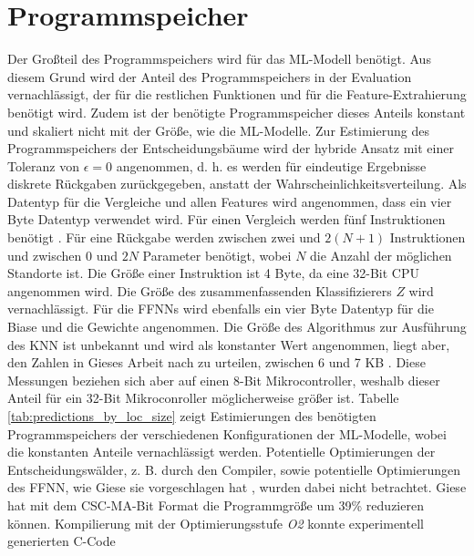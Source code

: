 \section{Programmspeicher}
Der Großteil des Programmspeichers wird für das ML-Modell benötigt.
Aus diesem Grund wird der Anteil des Programmspeichers in der Evaluation vernachlässigt,
der für die restlichen Funktionen und für die Feature-Extrahierung benötigt wird.
Zudem ist der benötigte Programmspeicher dieses Anteils konstant und skaliert nicht mit der Größe, wie die ML-Modelle.
\newline
\newline
Zur Estimierung des Programmspeichers der Entscheidungsbäume wird der hybride Ansatz mit einer Toleranz von $\epsilon=0$ angenommen,
d. h. es werden für eindeutige Ergebnisse diskrete Rückgaben zurückgegeben, anstatt der Wahrscheinlichkeitsverteilung.
Als Datentyp für die Vergleiche und allen Features wird angenommen, dass ein vier Byte Datentyp verwendet wird.
Für einen Vergleich werden fünf Instruktionen benötigt \cite{dymelThesis}.
Für eine Rückgabe werden zwischen zwei und $2(N+1)$ Instruktionen und zwischen 0 und $2N$ Parameter benötigt,
wobei $N$ die Anzahl der möglichen Standorte ist.
Die Größe einer Instruktion ist 4 Byte, da eine 32-Bit CPU angenommen wird.
Die Größe des zusammenfassenden Klassifizierers $Z$ wird vernachlässigt.
\newline
\newline
Für die FFNNs wird ebenfalls ein vier Byte Datentyp für die Biase und die Gewichte angenommen.
Die Größe des Algorithmus zur Ausführung des KNN ist unbekannt und wird als konstanter Wert angenommen,
liegt aber, den Zahlen in Gieses Arbeit nach zu urteilen, zwischen 6 und 7 KB \cite{gieseThesis}.
Diese Messungen beziehen sich aber auf einen 8-Bit Mikrocontroller, weshalb dieser Anteil für ein 32-Bit Mikroconroller möglicherweise größer ist.
\newline
\newline
Tabelle \ref{tab:predictions_by_loc_size} zeigt Estimierungen des benötigten Programmspeichers der verschiedenen Konfigurationen der ML-Modelle,
wobei die konstanten Anteile vernachlässigt werden.
Potentielle Optimierungen der Entscheidungswälder, z. B. durch den Compiler,
sowie potentielle Optimierungen des FFNN, wie Giese sie vorgeschlagen hat \cite{gieseThesis}, wurden dabei nicht betrachtet.
Giese hat mit dem CSC-MA-Bit Format die Programmgröße um 39\% reduzieren können.
Kompilierung mit der Optimierungsstufe \textit{O2} konnte experimentell generierten C-Code
